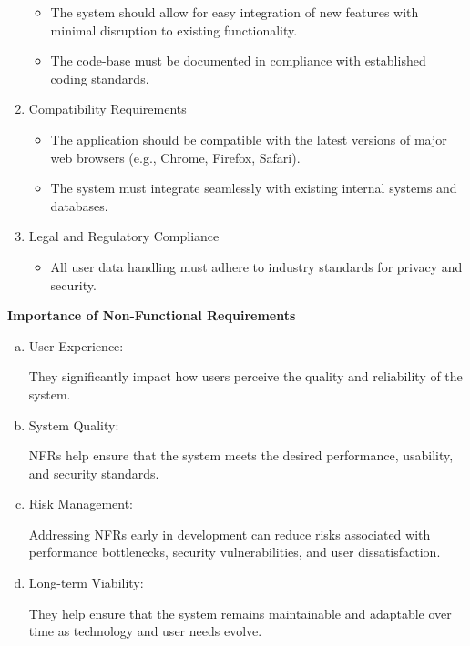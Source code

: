 \documentclass[a4paper]{article}
\begin{document}
\begin{enumerate}
\begin{itemize}
        \item The system should allow for easy integration of new features with minimal disruption to existing functionality.
        \item The code-base must be documented in compliance with established coding standards.
\end{itemize}
        \item Compatibility Requirements

\begin{itemize}
        \item The application should be compatible with the latest versions of major web browsers (e.g., Chrome, Firefox, Safari).
        \item The system must integrate seamlessly with existing internal systems and databases.
\end{itemize}
        \item Legal and Regulatory Compliance
\begin{itemize}
        \item All user data handling must adhere to industry standards for privacy and security.
\end{itemize}
\end{enumerate}
\textbf{Importance of Non-Functional Requirements}
\begin{enumerate}[(a).]
        \item User Experience:

            They significantly impact how users perceive the quality and reliability of the system.

        \item System Quality:

            NFRs help ensure that the system meets the desired performance, usability, and security standards.

        \item Risk Management:

            Addressing NFRs early in development can reduce risks associated with performance bottlenecks, security vulnerabilities, and
            user dissatisfaction.

        \item Long-term Viability:

            They help ensure that the system remains maintainable and adaptable over time as technology and user needs evolve.

\end {enumerate}
\end{document}
